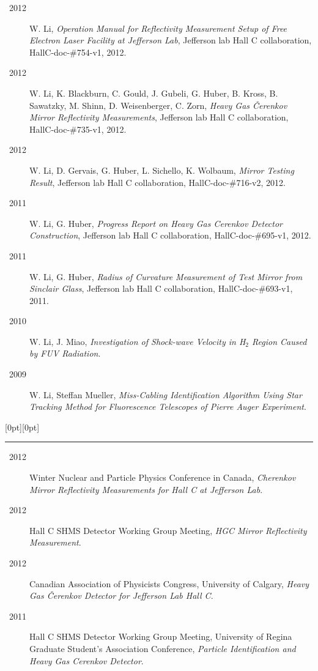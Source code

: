 \documentclass[letterpaper,12pt]{letter}
\begin{document}
\begin{description}
\item[~2012] \textrm{\normalsize W. Li, \emph{Operation Manual for Reflectivity Measurement Setup of Free Electron Laser Facility at Jefferson Lab}, Jefferson lab Hall C collaboration, HallC-doc-\#754-v1, 2012. }
\item[~2012] \textrm{\normalsize W. Li, K. Blackburn, C. Gould, J. Gubeli, G. Huber, B. Kross, B. Sawatzky, M. Shinn, D. Weisenberger, C. Zorn, \emph{Heavy Gas \v{C}erenkov Mirror Reflectivity Measurements}, Jefferson lab Hall C collaboration, HallC-doc-\#735-v1, 2012. }
\item[~2012] \textrm{\normalsize W. Li, D. Gervais, G. Huber, L. Sichello, K. Wolbaum, \emph{Mirror Testing Result}, Jefferson lab Hall C collaboration, HallC-doc-\#716-v2, 2012. }
\item[~2011] \textrm{\normalsize W. Li, G. Huber, \emph{Progress Report on Heavy Gas Cerenkov Detector Construction}, Jefferson lab Hall C collaboration, HallC-doc-\#695-v1, 2012. }
\item[~2011] \textrm{\normalsize W. Li, G. Huber, \emph{Radius of Curvature Measurement of Test Mirror from Sinclair Glass}, Jefferson lab Hall C collaboration, HallC-doc-\#693-v1, 2011.}
\item[~2010] \textrm{\normalsize W. Li, J. Miao, \emph{Investigation of Shock-wave Velocity in H$_2$ Region Caused by FUV Radiation}. }
\item[~2009] \textrm{\normalsize W. Li, Steffan Mueller, \emph{Miss-Cabling Identification Algorithm Using Star Tracking Method for Fluorescence Telescopes of Pierre Auger Experiment}.}




\end{description}



\vspace{-8mm}
\raisebox{0pt}[0pt][0pt]{\large\textbf{\raisebox{-3.5ex}{Presentation}}} 
\\[2mm]
\rule[-0.3cm]{4cm}{1pt}



\begin{description}
\item[~2012] \textrm{\normalsize Winter Nuclear and Particle Physics Conference in Canada, \emph{Cherenkov Mirror Reflectivity Measurements for Hall C at Jefferson Lab}. }
\item[~2012] \textrm{\normalsize Hall C SHMS Detector Working Group Meeting, \emph{HGC Mirror Reflectivity Measurement}. }
\item[~2012] \textrm{\normalsize Canadian Association of Physicists Congress, University of Calgary, \emph{Heavy Gas \v{C}erenkov Detector for Jefferson Lab Hall C}. }
\item[~2011] \textrm{\normalsize Hall C SHMS Detector Working Group Meeting, University of Regina Graduate Student's Association Conference, \emph{Particle Identification and Heavy Gas Cerenkov Detector}.}
\end{description}
\end{document}
